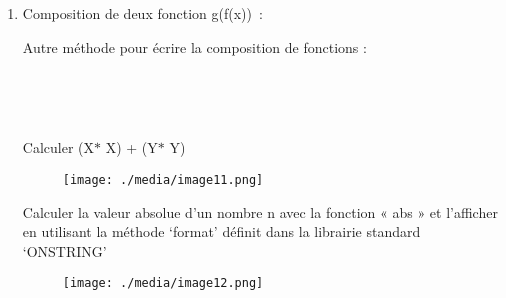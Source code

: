\documentclass[12pt]{article}
\begin{document}
\begin{enumerate}
	\item \par

Composition de deux fonction g(f(x)) :\par

Autre méthode pour écrire la composition de fonctions :\par





\begin{figure}[H]	\begin{subfigure}		\texttt{[image: ./media/image9.png]}
	\end{subfigure}
~	\begin{subfigure}		\texttt{[image: ./media/image10.png]}
	\end{subfigure}
~
\end{figure}



Calculer (X$\ast$ X) + (Y$\ast$ Y)\par


\vspace{\baselineskip}



\begin{figure}[H]
	\begin{FlushLeft}		\texttt{[image: ./media/image11.png]}
	\end{FlushLeft}\end{figure}



Calculer la valeur absolue d’un nombre n avec la fonction « abs » et l’afficher en utilisant la méthode ‘format’ définit dans la librairie standard ‘ONSTRING’\par




\begin{figure}[H]
	\begin{FlushLeft}		\texttt{[image: ./media/image12.png]}
	\end{FlushLeft}\end{figure}



\end{enumerate}
\end{document}
